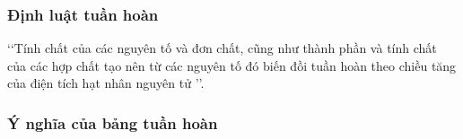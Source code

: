 \subsubsection{Định luật tuần hoàn}
\vspace{0.25 cm}
\begin{tomtat}
	\lq\lq Tính chất của các nguyên tố và đơn chất, cũng như thành phần và tính chất của các hợp chất tạo nên từ các nguyên tố đó biến đồi tuần hoàn theo chiều tăng của điện tích hạt nhân nguyên tử \rq\rq.
\end{tomtat}
\subsubsection{Ý nghĩa của bảng tuần hoàn}
